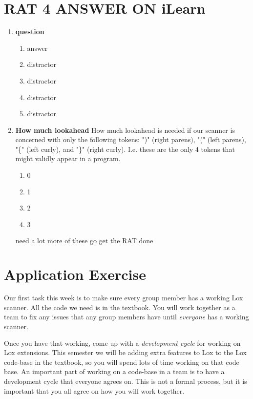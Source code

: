 \documentclass[twoside=false, DIV=14]{scrartcl}
\begin{document}
\part*{RAT 4 \hspace{6em} {\small ANSWER ON iLearn}}
\renewcommand{\labelenumii}{\alph{enumii}) $\square$}
\begin{enumerate}
\item \textbf{question}
\begin{enumerate}
  \item answer \tick
  \item distractor
  \item distractor
  \item distractor
  \item distractor
\end{enumerate}

\item \textbf{How much lookahead}
How much lookahead is needed if our scanner is concerned with only the following tokens: ")" (right parens), "(" (left parens), "\{" (left curly), and "\}" (right curly). I.e. these are the only 4 tokens that might validly appear in a program.
\begin{enumerate}
    \item[\tick] 0
    \item 1
    \item 2
    \item 3
\end{enumerate}

\begin{todo}
need a lot more of these go get the RAT done
\end{todo}
\end{enumerate}

\newpage
\part*{Application Exercise}

Our first task this week is to make sure every group member has a working Lox scanner.  All the code we need is in the textbook.  You will work together as a team to fix any issues that any group members have until \emph{everyone} has a working scanner.  

Once you have that working, come up with a \emph{development cycle} for working on Lox extensions.  This semester we will be adding extra features to Lox to the Lox code-base in the textbook, so you will spend lots of time working on that code base.  An important part of working on a code-base in a team is to have a development cycle that everyone agrees on.  This is not a formal process, but it is important that you all agree on how you will work together.
\end{document}
